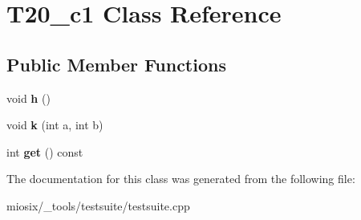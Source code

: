 \hypertarget{class_t20__c1}{\section{T20\-\_\-c1 Class Reference}
\label{class_t20__c1}
}
\subsection*{Public Member Functions}
\begin{DoxyCompactItemize}
\item 
\hypertarget{class_t20__c1_a7ded90bbf62b47ffe732cf92d287fbef}{void {\bfseries h} ()}\label{class_t20__c1_a7ded90bbf62b47ffe732cf92d287fbef}

\item 
\hypertarget{class_t20__c1_ad8d7806d01ef6254c7d91e2bfa5d4dd8}{void {\bfseries k} (int a, int b)}\label{class_t20__c1_ad8d7806d01ef6254c7d91e2bfa5d4dd8}

\item 
\hypertarget{class_t20__c1_a627b5114e0152a05622fef4def803b4c}{int {\bfseries get} () const }\label{class_t20__c1_a627b5114e0152a05622fef4def803b4c}

\end{DoxyCompactItemize}


The documentation for this class was generated from the following file\-:\begin{DoxyCompactItemize}
\item 
miosix/\-\_\-tools/testsuite/testsuite.\-cpp\end{DoxyCompactItemize}
